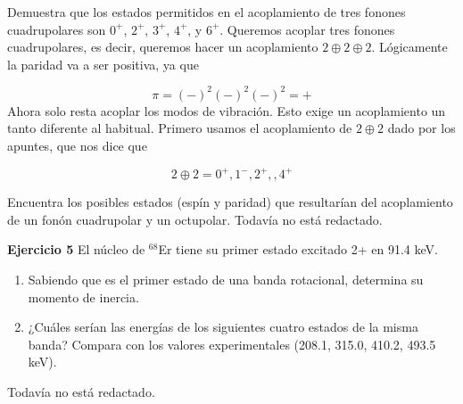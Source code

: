 \begin{texercise}
    Demuestra que los estados permitidos en el acoplamiento de tres fonones cuadrupolares son $0^+$, $2^+$, $3^+$, $4^+$, y $6^+$.
\tcblower
    Queremos acoplar tres fonones cuadrupolares, es decir, queremos hacer un acoplamiento $2\oplus 2\oplus 2$. Lógicamente la paridad va a ser positiva, ya que 

    \begin{equation}
        \pi = (-)^2 (-)^2 (-)^2 = +
    \end{equation}
    Ahora solo resta acoplar los modos de vibración. Esto exige un acoplamiento un tanto diferente al habitual. Primero usamos el acoplamiento de $2\oplus 2$ dado por los apuntes, que nos dice que 

    \begin{equation*}
        2 \oplus 2 = 0^+,1^-,2^+,,4^+
    \end{equation*}
    
\end{texercise}


\begin{texercise}
    Encuentra los posibles estados (espín y paridad) que resultarían del acoplamiento de un fonón cuadrupolar y un octupolar.
\tcblower
    Todavía no está redactado. 
\end{texercise}



\begin{texercise}
    \textbf{Ejercicio 5}
    El núcleo de $^{68}$Er tiene su primer estado excitado 2+ en 91.4 keV.
    \begin{enumerate}
        \item Sabiendo que es el primer estado de una banda rotacional, determina su momento de inercia.
        \item ¿Cuáles serían las energías de los siguientes cuatro estados de la misma banda? Compara con los valores experimentales (208.1, 315.0, 410.2, 493.5 keV).
    \end{enumerate}
\tcblower
Todavía no está redactado.
\end{texercise}


